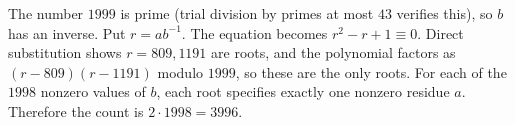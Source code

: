 The number $1999$ is prime (trial division by primes at most $43$ verifies this), so $b$ has an inverse. Put $r=ab^{-1}$. The equation becomes $r^2-r+1\equiv0$. Direct substitution shows $r=809,1191$ are roots, and the polynomial factors as $(r-809)(r-1191)$ modulo $1999$, so these are the only roots. For each of the $1998$ nonzero values of $b$, each root specifies exactly one nonzero residue $a$. Therefore the count is $2\cdot1998=\boxed{3996}$.
